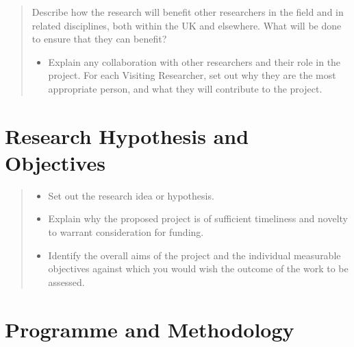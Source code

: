 \documentclass[twocolumn,a4paper,11pt]{article}
\begin{document}
\begin{quote}{\footnotesize
Describe how the research will benefit other researchers in the field and in related disciplines, both within the UK and elsewhere. What will be done to ensure that they can benefit?

\begin{itemize}
\item Explain any collaboration with other researchers and their role
  in the project. For each Visiting Researcher, set out why they are
  the most appropriate person, and what they will contribute to the
  project.
\end{itemize}
}
\end{quote}

\section{Research Hypothesis and Objectives}
\label{sec:rese-hypoth-object}

\begin{quote}{\footnotesize
  \begin{itemize}
  \item Set out the research idea or hypothesis.
  \item Explain why the proposed project is of sufficient timeliness
    and novelty to warrant consideration for funding.
  \item Identify the overall aims of the project and the individual
    measurable objectives against which you would wish the outcome of
    the work to be assessed.
  \end{itemize}
}\end{quote}


\section{Programme and Methodology}
\end{document}
